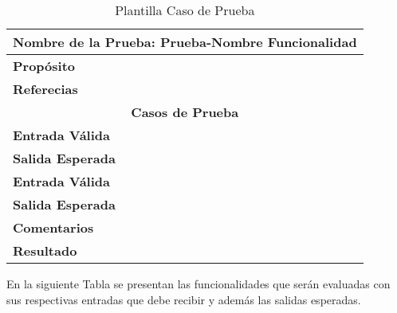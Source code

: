 \begin{table}[htb]
	\begin{tabular}{|l|l|}
		\hline
		\multicolumn{2}{|p{12cm}|}{\textbf{Nombre de la Prueba: Prueba-Nombre Funcionalidad}} \\ \hline
		\textbf{Propósito}                                 &                            \\ \hline
		\textbf{Referecias}                                &                            \\ \hline
		\multicolumn{2}{|c|}{\textbf{Casos de Prueba}}                                  \\ \hline
		\textbf{Entrada Válida}                            &                            \\ \hline
		\textbf{Salida Esperada}                           &                            \\ \hline
		\textbf{Entrada Válida}                            &                            \\ \hline
		\textbf{Salida Esperada}                           &                            \\ \hline
		\textbf{Comentarios}                               &                            \\ \hline
		\textbf{Resultado}                                 &                            \\ \hline
	\end{tabular}
	\caption {Plantilla Caso de Prueba}
\end{table}

\clearpage
\newpage

En la siguiente Tabla se presentan las funcionalidades que serán evaluadas con sus respectivas entradas que debe recibir  y además las salidas esperadas.\\

